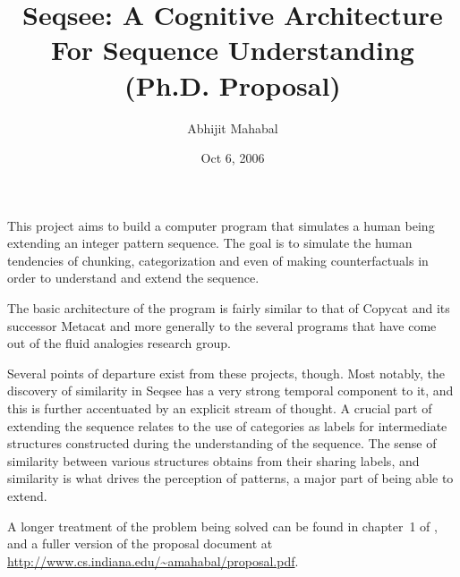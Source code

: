 \documentclass[12pt]{article}
\begin{document}
\title{Seqsee: A Cognitive Architecture For Sequence Understanding\\{(Ph.D. Proposal)}}
\author{Abhijit Mahabal}
\date{Oct 6, 2006}
\maketitle

\newcommand{\sequence}[1]{`\emph{#1 }{\ensuremath\ldots}'\xspace}

This project aims to build a computer program that simulates a human being extending an integer
 pattern sequence. The goal is to simulate the human tendencies of chunking, categorization and even of making counterfactuals in order to understand and extend the sequence.

The basic architecture of the program is fairly similar to that of Copycat \cite{Mitchell90} and its successor Metacat \cite{Marshall} and more generally to the several programs that have come out of the fluid analogies research group. 

Several points of departure exist from these projects, though. Most notably, the discovery of similarity in Seqsee has a very strong temporal component to it, and this is further accentuated by an explicit stream of thought. A crucial part of extending the sequence relates to the use of categories as labels for intermediate structures constructed during the understanding of the sequence. The sense of similarity between various structures obtains from their sharing labels, and similarity is what drives the perception of patterns, a major part of being able to extend.

A longer treatment of the problem being solved can be found in chapter~1 of , and a fuller version of the proposal document at \url{http://www.cs.indiana.edu/~amahabal/proposal.pdf}.



\end{document}
